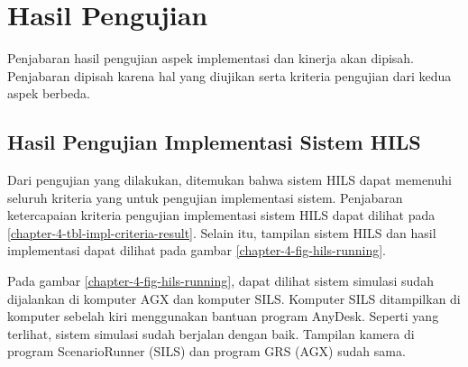 \section{Hasil Pengujian}

Penjabaran hasil pengujian aspek implementasi dan kinerja akan dipisah.
Penjabaran dipisah karena hal yang diujikan serta kriteria pengujian dari kedua
aspek berbeda.

\subsection{Hasil Pengujian Implementasi Sistem HILS}

Dari pengujian yang dilakukan, ditemukan bahwa sistem HILS dapat memenuhi
seluruh kriteria yang untuk pengujian implementasi sistem. Penjabaran
ketercapaian kriteria pengujian implementasi sistem HILS dapat dilihat pada
\ref{chapter-4-tbl-impl-criteria-result}. Selain itu, tampilan sistem HILS dan
hasil implementasi dapat dilihat pada gambar \ref{chapter-4-fig-hils-running}.

Pada gambar \ref{chapter-4-fig-hils-running}, dapat dilihat sistem simulasi
sudah dijalankan di komputer AGX dan komputer SILS. Komputer SILS ditampilkan di
komputer sebelah kiri menggunakan bantuan program AnyDesk. Seperti yang
terlihat, sistem simulasi sudah berjalan dengan baik. Tampilan kamera di program
ScenarioRunner (SILS) dan program GRS (AGX) sudah sama.

